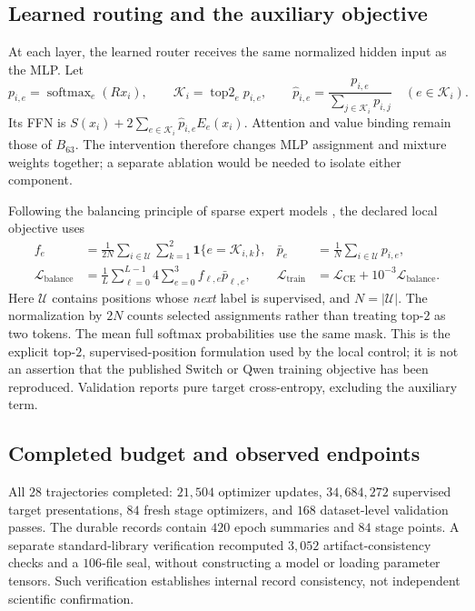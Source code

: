 \documentclass{article}
\newcommand{\softmax}{\operatorname{softmax}}
\newcommand{\Ind}{\mathbf{1}}
\newcommand{\CE}{\mathcal{L}}
\begin{document}
\subsection{Learned routing and the auxiliary objective}
At each layer, the learned router receives the same normalized hidden input as the MLP. Let
\begin{equation}
 p_{i,e}=\softmax_e(Rx_i),\qquad
 \mathcal K_i=\operatorname{top2}_e p_{i,e},\qquad
 \widehat p_{i,e}=\frac{p_{i,e}}{\sum_{j\in\mathcal K_i}p_{i,j}}\quad(e\in\mathcal K_i).
\end{equation}
Its FFN is $S(x_i)+2\sum_{e\in\mathcal K_i}\widehat p_{i,e}E_e(x_i)$. Attention and value binding remain those of $B_{63}$. The intervention therefore changes MLP assignment and mixture weights together; a separate ablation would be needed to isolate either component.

Following the balancing principle of sparse expert models \citep{fedus2022switch}, the declared local objective uses
\begin{align}
 f_e&=\frac{1}{2N}\sum_{i\in\mathcal U}\sum_{k=1}^{2}\Ind\{e=\mathcal K_{i,k}\},
 &\bar p_e&=\frac{1}{N}\sum_{i\in\mathcal U}p_{i,e},\\
 \CE_{\mathrm{balance}}&=\frac{1}{L}\sum_{\ell=0}^{L-1}4\sum_{e=0}^{3}f_{\ell,e}\bar p_{\ell,e},
 &\CE_{\mathrm{train}}&=\CE_{\mathrm{CE}}+10^{-3}\CE_{\mathrm{balance}}.
 \label{eq:balance}
\end{align}
Here $\mathcal U$ contains positions whose \emph{next} label is supervised, and $N=|\mathcal U|$. The normalization by $2N$ counts selected assignments rather than treating top-$2$ as two tokens. The mean full softmax probabilities use the same mask. This is the explicit top-$2$, supervised-position formulation used by the local control; it is not an assertion that the published Switch or Qwen training objective has been reproduced. Validation reports pure target cross-entropy, excluding the auxiliary term.

\subsection{Completed budget and observed endpoints}
All $28$ trajectories completed: $21{,}504$ optimizer updates, $34{,}684{,}272$ supervised target presentations, $84$ fresh stage optimizers, and $168$ dataset-level validation passes. The durable records contain $420$ epoch summaries and $84$ stage points. A separate standard-library verification recomputed $3{,}052$ artifact-consistency checks and a $106$-file seal, without constructing a model or loading parameter tensors. Such verification establishes internal record consistency, not independent scientific confirmation.
\end{document}
